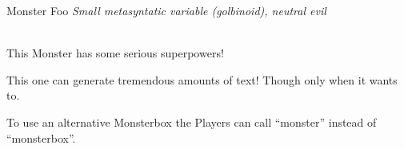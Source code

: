 \documentclass[10pt,twoside,twocolumn]{article}
\begin{document}
\begin{monsterbox}{Monster Foo}
	\textit{Small metasyntatic variable (golbinoid), neutral evil}\\
	\hline
	\basics[%
	armorclass = 12,
	hitpoints  = 16 (3d8 + 3),
	speed      = 50 ft
	]
	\hline
	\stats[
	STR = 12 (+1),
	DEX = 14 (+2)
	]
	\hline
	\details[%
	languages = {Common Lisp, Erlang},
	]
	\hline \\[1mm]
	\begin{monsteraction}
		This Monster has some serious superpowers!
	\end{monsteraction}
	\begin{monsteraction}
		This one can generate tremendous amounts of text! Though only when it wants to.
	\end{monsteraction}
	
	\begin{monsteraction}
		To use an alternative Monsterbox the Players can call "`monster"' instead of "`monsterbox"'.
	\end{monsteraction}
\end{monsterbox}

\end{document}
